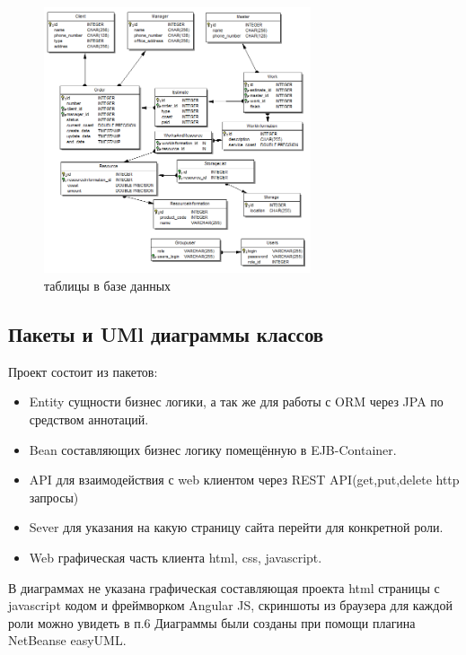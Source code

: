 \begin{figure}[!ht]
	\centering
	\includegraphics[width=0.7\textwidth]{img/database.png}
	\caption{таблицы в базе данных}
\end{figure}

\subsection{Пакеты и UMl диаграммы классов}
Проект состоит из пакетов:
\begin{itemize}
\item Entity сущности бизнес логики, а так же для работы с ORM через JPA по средством аннотаций.
\item Bean составляющих бизнес логику помещённую в EJB-Container.
\item API для взаимодействия с web клиентом через REST API(get,put,delete http запросы)
\item Sever для указания на какую страницу сайта перейти для конкретной роли.
\item Web графическая часть клиента html, css, javascript.
\end{itemize}
В диаграммах не указана графическая составляющая проекта html страницы с javascript кодом и фреймворком Angular JS, скриншоты из браузера для каждой роли можно увидеть в п.6
Диаграммы были созданы при помощи плагина NetBeanse easyUML.
\newpage
